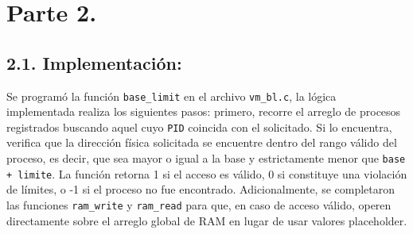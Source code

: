 \documentclass[12pt,letterpaper]{article}
\begin{document}
\newpage

\section*{Parte 2.}

\subsection*{2.1. Implementación:}
Se programó la función \texttt{base\_limit} en el archivo \texttt{vm\_bl.c}, la lógica implementada realiza los
siguientes pasos: primero, recorre el arreglo de procesos registrados buscando aquel cuyo \texttt{PID} coincida
con el solicitado. Si lo encuentra, verifica que la dirección física solicitada se encuentre dentro del rango
válido del proceso, es decir, que sea mayor o igual a la base y estrictamente menor que \texttt{base + limite}.
La función retorna 1 si el acceso es válido, 0 si constituye una violación de límites, o -1 si el proceso no fue
encontrado. Adicionalmente, se completaron las funciones \texttt{ram\_write} y \texttt{ram\_read} para que, en
caso de acceso válido, operen directamente sobre el arreglo global de RAM en lugar de usar valores placeholder.
\end{document}
